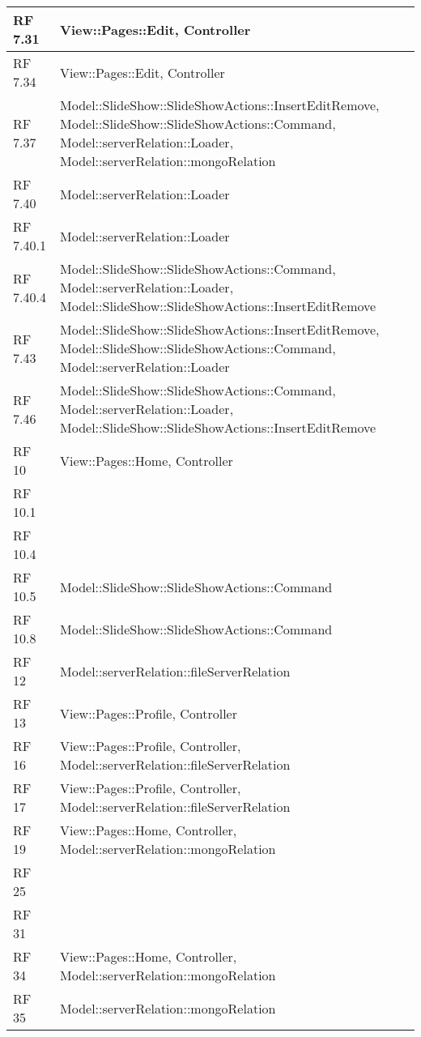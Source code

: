 {\begin{longtable} [c]{| p{2cm} | p{13cm} |}
 \hline 
RF 7.31 & View::\-Pages::\-Edit, Controller\\ 
 \hline 
RF 7.34 & View::\-Pages::\-Edit, Controller\\ 
 \hline 
RF 7.37 & Model::\-SlideShow::\-SlideShowActions::\-InsertEditRemove, Model::\-SlideShow::\-SlideShowActions::\-Command, Model::\-serverRelation::\-Loader, Model::\-serverRelation::\-mongoRelation\\ 
 \hline 
RF 7.40 & Model::\-serverRelation::\-Loader\\ 
 \hline 
RF 7.40.1 & Model::\-serverRelation::\-Loader\\ 
 \hline 
RF 7.40.4 & Model::\-SlideShow::\-SlideShowActions::\-Command, Model::\-serverRelation::\-Loader, Model::\-SlideShow::\-SlideShowActions::\-InsertEditRemove\\ 
 \hline 
RF 7.43 & Model::\-SlideShow::\-SlideShowActions::\-InsertEditRemove, Model::\-SlideShow::\-SlideShowActions::\-Command, Model::\-serverRelation::\-Loader\\ 
 \hline 
RF 7.46 & Model::\-SlideShow::\-SlideShowActions::\-Command, Model::\-serverRelation::\-Loader, Model::\-SlideShow::\-SlideShowActions::\-InsertEditRemove\\ 
 \hline 
RF 10 & View::\-Pages::\-Home, Controller\\ 
 \hline 
RF 10.1 & \\ 
 \hline 
RF 10.4 & \\ 
 \hline 
RF 10.5 & Model::\-SlideShow::\-SlideShowActions::\-Command\\ 
 \hline 
RF 10.8 & Model::\-SlideShow::\-SlideShowActions::\-Command\\ 
 \hline 
RF 12 & Model::\-serverRelation::\-fileServerRelation\\ 
 \hline 
RF 13 & View::\-Pages::\-Profile, Controller\\ 
 \hline 
RF 16 & View::\-Pages::\-Profile, Controller, Model::\-serverRelation::\-fileServerRelation\\ 
 \hline 
RF 17 & View::\-Pages::\-Profile, Controller, Model::\-serverRelation::\-fileServerRelation\\ 
 \hline 
RF 19 & View::\-Pages::\-Home, Controller, Model::\-serverRelation::\-mongoRelation\\ 
 \hline 
RF 25 & \\ 
 \hline 
RF 31 & \\ 
 \hline 
RF 34 & View::\-Pages::\-Home, Controller, Model::\-serverRelation::\-mongoRelation\\ 
 \hline 
RF 35 & Model::\-serverRelation::\-mongoRelation\\ 

\end{longtable}}
